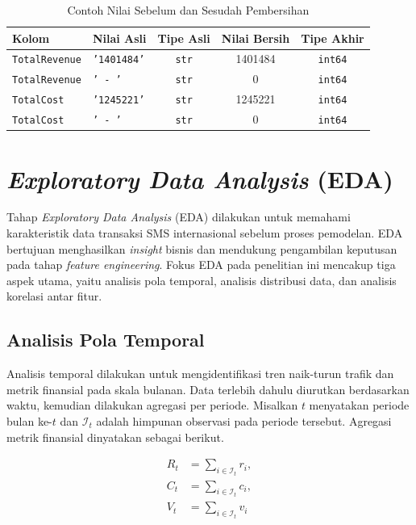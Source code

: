 \begin{table}[H]
\centering
\caption{Contoh Nilai Sebelum dan Sesudah Pembersihan}
\label{tab:konversi_numerik}
\begin{tabular}{llccc}
\toprule
\textbf{Kolom} & \textbf{Nilai Asli} & \textbf{Tipe Asli} & \textbf{Nilai Bersih} & \textbf{Tipe Akhir} \\
\midrule
\texttt{TotalRevenue} & \texttt{'1401484'} & \texttt{str} & 1401484 & \texttt{int64} \\
\texttt{TotalRevenue} & \texttt{' - '}     & \texttt{str} & 0         & \texttt{int64} \\
\texttt{TotalCost}    & \texttt{'1245221'} & \texttt{str} & 1245221 & \texttt{int64} \\
\texttt{TotalCost}    & \texttt{' - '}     & \texttt{str} & 0         & \texttt{int64} \\
\bottomrule
\end{tabular}
\par\vspace{4pt}
\end{table}


\section{\textit{Exploratory Data Analysis} (EDA)}
\label{sec:eda}

Tahap \textit{Exploratory Data Analysis} (EDA) dilakukan untuk memahami karakteristik data transaksi SMS internasional sebelum proses pemodelan. EDA bertujuan menghasilkan \textit{insight} bisnis dan mendukung pengambilan keputusan pada tahap \textit{feature engineering}. Fokus EDA pada penelitian ini mencakup tiga aspek utama, yaitu analisis pola temporal, analisis distribusi data, dan analisis korelasi antar fitur.

\subsection{Analisis Pola Temporal}
Analisis temporal dilakukan untuk mengidentifikasi tren naik-turun trafik dan metrik finansial pada skala bulanan. Data terlebih dahulu diurutkan berdasarkan waktu, kemudian dilakukan agregasi per periode. Misalkan $t$ menyatakan periode bulan ke-$t$ dan $\mathcal{I}_t$ adalah himpunan observasi pada periode tersebut. Agregasi metrik finansial dinyatakan sebagai berikut.

\begin{align}
R_t &= \sum_{i \in \mathcal{I}_t} r_i, \\
C_t &= \sum_{i \in \mathcal{I}_t} c_i, \\
V_t &= \sum_{i \in \mathcal{I}_t} v_i
\end{align}


